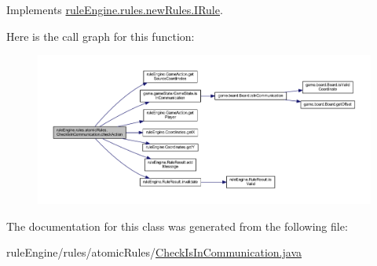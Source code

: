 Implements \mbox{\hyperlink{interfacerule_engine_1_1rules_1_1new_rules_1_1_i_rule_a72ce29a47d7a5fba75a09444a50a481e}{rule\+Engine.\+rules.\+new\+Rules.\+I\+Rule}}.

Here is the call graph for this function\+:
\nopagebreak
\begin{figure}[H]
\begin{center}
\leavevmode
\includegraphics[width=350pt]{classrule_engine_1_1rules_1_1atomic_rules_1_1_check_is_in_communication_a333d209cb3eb29f7af7a09685c95afeb_cgraph}
\end{center}
\end{figure}


The documentation for this class was generated from the following file\+:\begin{DoxyCompactItemize}
\item 
rule\+Engine/rules/atomic\+Rules/\mbox{\hyperlink{_check_is_in_communication_8java}{Check\+Is\+In\+Communication.\+java}}\end{DoxyCompactItemize}
